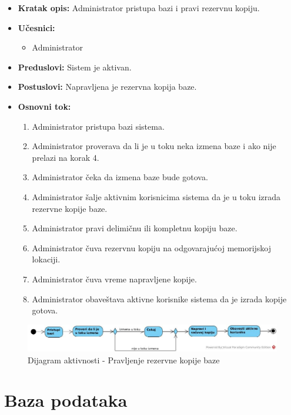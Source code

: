 \documentclass[titlepage]{article}
\begin{document}
\begin{itemize}
    \item \textbf{Kratak opis:} Administrator pristupa bazi i pravi rezervnu kopiju.
    \item \textbf{Učesnici:}
        \begin{itemize}
            \item Administrator
        \end{itemize}
    \item \textbf{Preduslovi:} Sistem je aktivan.
    \item \textbf{Postuslovi:} Napravljena je rezervna kopija baze.
    \item \textbf{Osnovni tok:}
        \begin{enumerate}
            \item Administrator pristupa bazi sistema.
            \item Administrator proverava da li je u toku neka izmena baze i ako nije prelazi na korak 4.
            \item Administrator čeka da izmena baze bude gotova.
            \item Administrator šalje aktivnim korisnicima sistema da je u toku izrada rezervne kopije baze.
            \item Administrator pravi delimičnu ili kompletnu kopiju baze.
            \item Administrator čuva rezervnu kopiju na odgovarajućoj memorijskoj lokaciji.
            \item Administrator čuva vreme napravljene kopije.
            \item Administrator obaveštava aktivne korisnike sistema da je izrada kopije gotova.
        \end{enumerate}
\end{itemize}

\begin{figure}[H]
\centering
\includegraphics[scale=0.45]{Kopija}
\caption{Dijagram aktivnosti - Pravljenje rezervne kopije baze}
\label{slk:dodavanje}
\end{figure}

\section{Baza podataka}
\end{document}
